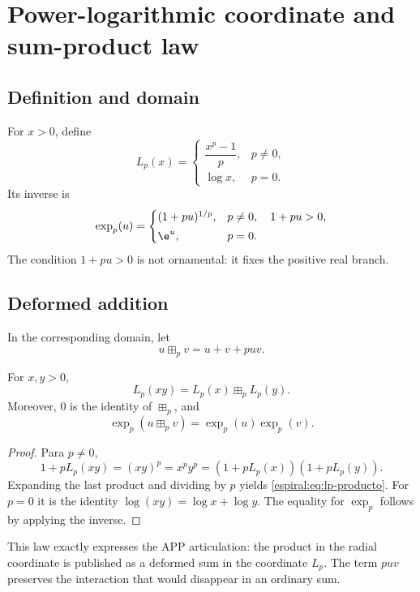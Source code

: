 \chapter{Power-logarithmic coordinate and sum-product law}

\section{Definition and domain}

For \(x>0\), define
\begin{equation}
 L_p(x)=
 \begin{cases}
 \dfrac{x^p-1}{p},&p\neq0,\\[2mm]
 \log x,&p=0.
 \end{cases}
 \label{espiral:eq:lp-def}
\end{equation}
Its inverse is
\begin{equation}
 \exp_p(u)=
 \begin{cases}
 (1+pu)^{1/p},&p\neq0,\quad1+pu>0,\\[1mm]
 \e^u,&p=0.
 \end{cases}
 \label{espiral:eq:exp-p}
\end{equation}
The condition \(1+pu>0\) is not ornamental: it fixes the positive real branch.

\section{Deformed addition}

In the corresponding domain, let
\[
 u\boxplus_pv=u+v+puv.
\]

\begin{theorem}
For \(x,y>0\),
\begin{equation}
 L_p(xy)=L_p(x)\boxplus_pL_p(y).
 \label{espiral:eq:lp-producto}
\end{equation}
Moreover, \(0\) is the identity of \(\boxplus_p\), and
\[
 \exp_p(u\boxplus_pv)=\exp_p(u)\exp_p(v).
\]
\end{theorem}
\begin{proof}
Para \(p\neq0\),
\[
 1+pL_p(xy)=(xy)^p=x^py^p
 =(1+pL_p(x))(1+pL_p(y)).
\]
Expanding the last product and dividing by \(p\) yields
\cref{espiral:eq:lp-producto}. For \(p=0\) it is the identity
\(\log(xy)=\log x+\log y\). The equality for \(\exp_p\) follows by applying
the inverse.
\end{proof}

This law exactly expresses the APP articulation: the product in the
radial coordinate is published as a deformed sum in the coordinate
\(L_p\). The term \(puv\) preserves the interaction that would disappear in
an ordinary sum.

